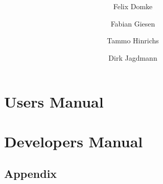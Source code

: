 \documentclass{ocpmanual}
\title{\cp\ \cpversion}
\author{Felix Domke \and Fabian Giesen \and Tammo Hinrichs \and Dirk Jagdmann}
\begin{document}
\frontmatter
\maketitle

\newpage

\begin{latexonly}
\pagestyle{empty}
\tableofcontents
\end{latexonly}

\mainmatter
\part{Users Manual}







\part{Developers Manual}


 


\backmatter
\begin{appendix}
\part{Appendix}

\end{appendix}
\end{document}
